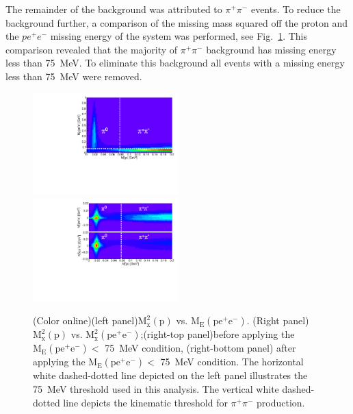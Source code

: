 \documentclass[aps,prc,twocolumn,floatfix,showpacs,preprintnumbers,amsmath,amssymb,superscriptaddress]{revtex4-1}
\begin{document}
The remainder of the background was attributed to $\pi^+\pi^-$
events. To reduce the background further, a comparison of the missing mass squared off the proton and the $pe^+e^-$ missing energy of the system was 
performed, see Fig.~\ref{fig:sys}. This comparison revealed that the majority of
$\pi^+\pi^-$ background has missing energy less than 75~MeV. 
To eliminate this background all events with a missing energy 
less than 75~MeV were removed.

\begin{figure}[htb!]
	\centerline{
		\includegraphics[height=0.4\textwidth,width=0.5\textwidth]{ME_vs_mxpcompare.pdf} \label{fig:beforecut}\hfill
		\includegraphics[height=0.4\textwidth,width=0.5\textwidth]{mm2_vs_mxp_compare.pdf}
		\label{fig:aftercut}}	
	\caption{(Color online)(left panel)$\mathrm{M_x^2(p)}$ vs. $\mathrm{M_E(pe^+e^-)}$. (Right panel)$\mathrm{M_x^2(p)}$ vs. $\mathrm{M_x^2(pe^+e^-)}$;(right-top panel)before applying the $\mathrm{M_E(pe^+e^-)} <$ 75~MeV condition, (right-bottom panel) after applying the $\mathrm{M_E(pe^+e^-)} <$ 75~MeV condition. The horizontal white dashed-dotted line depicted on the left panel illustrates the 75~MeV threshold used in this analysis. The vertical white dashed-dotted line depicts the kinematic threshold for $\pi^+\pi^-$  production.	
	}\label{fig:sys}		
\end{figure}
\end{document}
